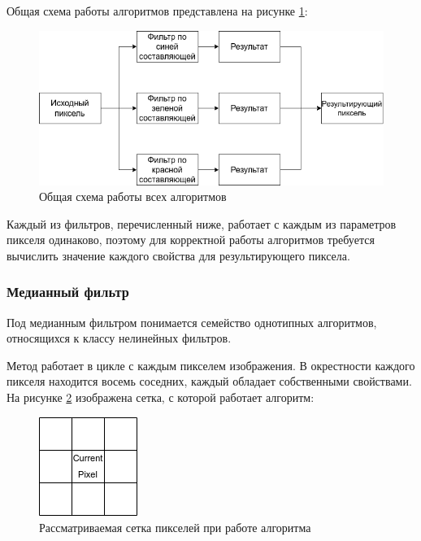 Общая схема работы алгоритмов представлена на рисунке \ref{fig::allAlgs}:
\FloatBarrier
 \begin{figure}[h]	
 	\begin{center}
 		\includegraphics[width=\linewidth]{inc/png/allAlgs.png}
 	\end{center}
 	\captionsetup{justification=centering}
 	\caption{Общая схема работы всех алгоритмов}
 	\label{fig::allAlgs}
 \end{figure}
\FloatBarrier

Каждый из фильтров, перечисленный ниже, работает с каждым из параметров пикселя одинаково, поэтому для корректной работы алгоритмов требуется вычислить значение каждого свойства для результирующего пиксела.

\subsubsection{Медианный фильтр}
Под медианным фильтром понимается семейство однотипных алгоритмов, относящихся к классу нелинейных фильтров.

Метод работает в цикле с каждым пикселем изображения. 
В окрестности каждого пикселя находится восемь соседних, каждый обладает собственными свойствами. 
На рисунке \ref{fig::grid} изображена сетка, с которой работает алгоритм:

\FloatBarrier
\begin{figure}[h]	
	\begin{center}
		\includegraphics[]{inc/png/grid.png}
	\end{center}
	\captionsetup{justification=centering}
	\caption{Рассматриваемая сетка пикселей при работе алгоритма}
	\label{fig::grid}
\end{figure}
\FloatBarrier
\newpage

